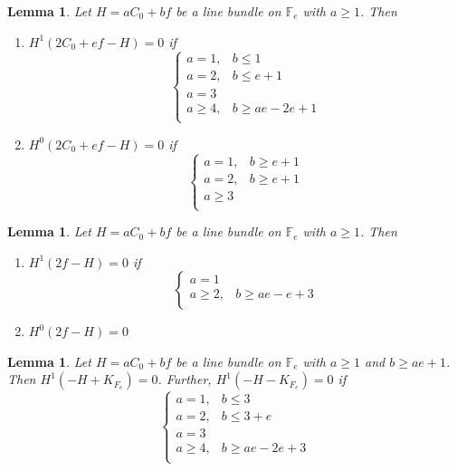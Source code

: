 \documentclass[11pt,twoside]{amsart}
\theoremstyle{plain}
\numberwithin{equation}{section}
\newtheorem{lemma}[theorem]{Lemma}
\theoremstyle{definition}
\begin{document}
\begin{lemma}\label{2C_0+ef-H}
Let $H = aC_0+bf$ be a line bundle on $\mathbb{F}_e$ with $a \geq 1$. Then 
\begin{enumerate}
    \item[(1)] $H^1(2C_0+ef-H) = 0$ if 
\[
\begin{cases}
   a = 1, & b \leq 1  \\
   a = 2, & b \leq e+1 \\
   a = 3 & \\
   a \geq 4, & b \geq ae-2e+1 \\
\end{cases}
\]

\item[(2)] $H^0(2C_0+ef-H) = 0$ if 
\[
\begin{cases}
   a = 1, & b \geq e+1  \\
   a = 2, & b \geq e+1 \\
   a \geq 3 & \\
\end{cases}
\] 

\end{enumerate}

    
\end{lemma}

\begin{lemma}\label{2f-H}
Let $H = aC_0+bf$ be a line bundle on $\mathbb{F}_e$ with $a \geq 1$. Then 
\begin{enumerate}
    \item[(1)] $H^1(2f-H) = 0$ if 
\[
\begin{cases}
   a = 1 &   \\
   a \geq 2, & b \geq ae-e+3 \\
   
\end{cases}
\]

\item[(2)] $H^0(2f-H) = 0$ 



\end{enumerate}  

\end{lemma}


\begin{lemma}\label{-H-K_Y}
Let $H = aC_0+bf$ be a line bundle on $\mathbb{F}_e$ with $a \geq 1$ and $b \geq ae+1$. Then $H^1(-H+K_{F_e}) = 0$. Further, $H^1(-H-K_{F_e}) = 0$ if 
 \[
\begin{cases}
   a = 1, & b \leq 3  \\
   a = 2, & b \leq 3+e \\
   a = 3 & \\
   a \geq 4, & b \geq ae-2e+3 \\
\end{cases}
 \]

\end{lemma}
\end{document}
